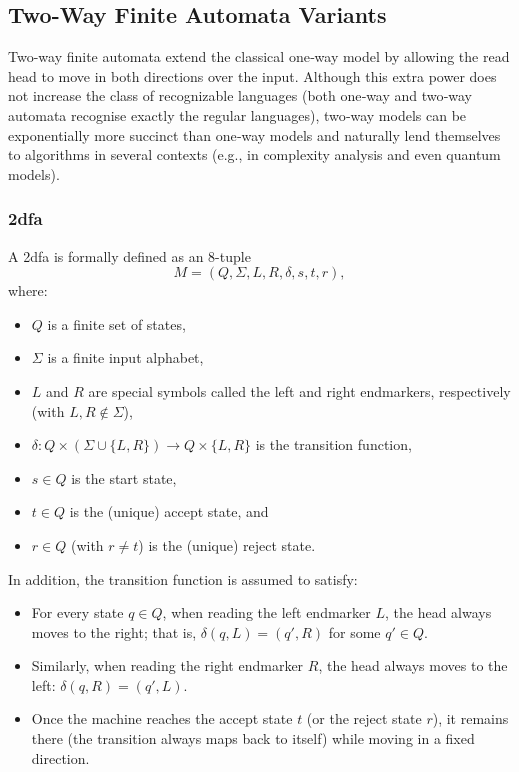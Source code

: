 
\subsection{Two-Way Finite Automata Variants}
\label{subsec:two-way-variants}

Two-way finite automata extend the classical one‐way model by allowing the read head to move in both directions over the input. Although this extra power does not increase the class of recognizable languages (both one‐way and two‐way automata recognise exactly the regular languages), two‐way models can be exponentially more succinct than one‐way models and naturally lend themselves to algorithms in several contexts (e.g., in complexity analysis and even quantum models).


\subsubsection{\acrfull{2dfa}}
\label{subsubsec:2dfa}

\begin{definition}
A \gls{2dfa} is formally defined as an 8-tuple 
\[
M = (Q, \Sigma, L, R, \delta, s, t, r),
\]
where:
\begin{itemize}
  \item \(Q\) is a finite set of states,
  \item \(\Sigma\) is a finite input alphabet,
  \item \(L\) and \(R\) are special symbols called the left and right endmarkers, respectively (with \(L,R \notin \Sigma\)),
  \item \(\delta: Q \times (\Sigma \cup \{L, R\}) \to Q \times \{L, R\}\) is the transition function,
  \item \(s\in Q\) is the start state,
  \item \(t\in Q\) is the (unique) accept state, and
  \item \(r\in Q\) (with \(r\neq t\)) is the (unique) reject state.
\end{itemize}
In addition, the transition function is assumed to satisfy:
\begin{itemize}
  \item For every state \(q\in Q\), when reading the left endmarker \(L\), the head always moves to the right; that is, \(\delta(q,L) = (q', R)\) for some \(q'\in Q\).
  \item Similarly, when reading the right endmarker \(R\), the head always moves to the left: \(\delta(q,R) = (q', L)\).
  \item Once the machine reaches the accept state \(t\) (or the reject state \(r\)), it remains there (the transition always maps back to itself) while moving in a fixed direction.
\end{itemize}
\end{definition}

